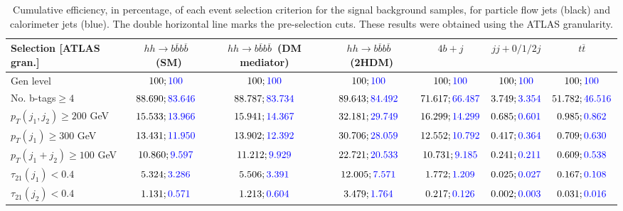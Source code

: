 \begin{landscape}
		\begin{table}
			\centering
			\caption{Cumulative efficiency, in percentage, of each event selection criterion for the signal background samples, for particle flow jets (black) and calorimeter jets (blue). The double horizontal line marks the pre-selection cuts. These results were obtained using the ATLAS granularity.}
			\begin{tabular}{lcccccc}
				\toprule 
				\textbf{Selection [ATLAS gran.]} & $hh\rightarrow b\overline{b}b\overline{b}$~(SM) & $hh\rightarrow b\overline{b}b\overline{b}$~(DM mediator) & $hh\rightarrow b\overline{b}b\overline{b}$~(2HDM) & $4b+j$  & $jj+0/1/2 j$ & $t\overline{t}$ \\
				\midrule
				Gen level & $100;\textcolor{blue}{100}$ & $100;\textcolor{blue}{100}$ &$100;\textcolor{blue}{100}$& $100;\textcolor{blue}{100}$& $100;\textcolor{blue}{100}$& $100;\textcolor{blue}{100}$ \\
				\rowcolor{black!7}No. b-tags$\geq 4$&$88.690;\textcolor{blue}{83.646}$&$88.787;\textcolor{blue}{83.734}$&$89.643;\textcolor{blue}{84.492}$&$71.617;\textcolor{blue}{66.487}$&$3.749;\textcolor{blue}{3.354}$&$51.782;\textcolor{blue}{46.516}$\\
				$p_T(j_1,j_2)\geq200$ GeV & $15.533;\textcolor{blue}{13.966}$ & $15.941;\textcolor{blue}{14.367}$&$32.181;\textcolor{blue}{29.749}$ &$16.299;\textcolor{blue}{14.299}$&$0.685;\textcolor{blue}{0.601}$&$0.985;\textcolor{blue}{0.862}$\\ 
				\midrule \midrule
				\rowcolor{black!7}$p_T(j_1)\geq 300$ GeV & $13.431;\textcolor{blue}{11.950}$ &$13.902;\textcolor{blue}{12.392}$  &$30.706;\textcolor{blue}{28.059}$&$12.552;\textcolor{blue}{10.792}$&$0.417;\textcolor{blue}{0.364}$&$0.709;\textcolor{blue}{0.630}$\\ 
				$p_T(j_1+j_2)\geq 100$ GeV &$10.860;\textcolor{blue}{9.597}$ & $11.212;\textcolor{blue}{9.929}$ &$22.721;\textcolor{blue}{20.533}$&$10.731;\textcolor{blue}{9.185}$&$0.241;\textcolor{blue}{0.211}$&$0.609;\textcolor{blue}{0.538}$\\
				\rowcolor{black!7}$\tau_{21}(j_1)<0.4$ & $5.324;\textcolor{blue}{3.286}$& $5.506;\textcolor{blue}{3.391}$&$12.005;\textcolor{blue}{7.571}$&$1.772;\textcolor{blue}{1.209}$&$0.025;\textcolor{blue}{0.027}$&$0.167;\textcolor{blue}{0.108}$\\
				$\tau_{21}(j_2)<0.4$ &$1.131;\textcolor{blue}{0.571}$ &$1.213;\textcolor{blue}{0.604}$ &$3.479;\textcolor{blue}{1.764}$&$0.217;\textcolor{blue}{0.126}$&$0.002;\textcolor{blue}{0.003}$&$0.031;\textcolor{blue}{0.016}$\\

\end{tabular}
\end{table}
\end{landscape}
